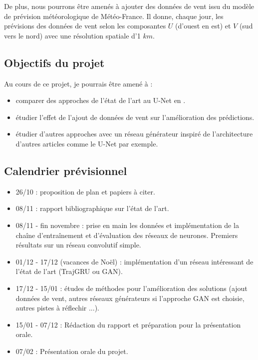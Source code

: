 \documentclass[12pt,a4paper,french]{article}
\newcommand\subsecspacing{1cm}
\begin{document}
De plus, nous pourrons être amenés à ajouter des données de vent issu du modèle de prévision météorologique de Météo-France. Il donne, chaque jour, les prévisions des données de vent selon les composantes $ U $ (d'ouest en est) et $ V $ (sud vers le nord) avec une résolution spatiale d'1 $ km $. \cite{bouget:hal-03112093}

\vspace{\subsecspacing}

\subsection{Objectifs du projet}

Au cours de ce projet, je pourrais être amené à :
\begin{itemize}[label=--]
    \item comparer des approches de l'état de l'art au U-Net en \cite{bouget:hal-03112093}.
    \item étudier l'effet de l'ajout de données de vent sur l'amélioration des prédictions. 
    \item étudier d'autres approches avec un réseau générateur inspiré de l'architecture d'autres articles comme le U-Net par exemple.
\end{itemize}

\vspace{\subsecspacing}

\subsection{Calendrier prévisionnel}

\begin{itemize}[label=--]
    \item 26/10 : proposition de plan et papiers à citer.
    \item 08/11 : rapport bibliographique sur l'état de l'art.
    \item 08/11 - fin novembre : prise en main les données et implémentation de la chaîne d'entraînement et d'évaluation des réseaux de neurones. Premiers résultats sur un réseau convolutif simple.
    \item 01/12 - 17/12 (vacances de Noël) : implémentation d'un réseau intéressant de l'état de l'art (TrajGRU ou GAN).
    \item 17/12 - 15/01 : études de méthodes pour l'amélioration des solutions (ajout données de vent, autres réseaux générateurs si l'approche GAN est choisie, autres pistes à réflechir ...). 
    \item 15/01 - 07/12 : Rédaction du rapport et préparation pour la présentation orale. 
    \item 07/02 : Présentation orale du projet.
    
\end{itemize}

\newpage

\nocite{zebiri:tel-03127158}
\printbibliography[title=Références]
\end{document}
